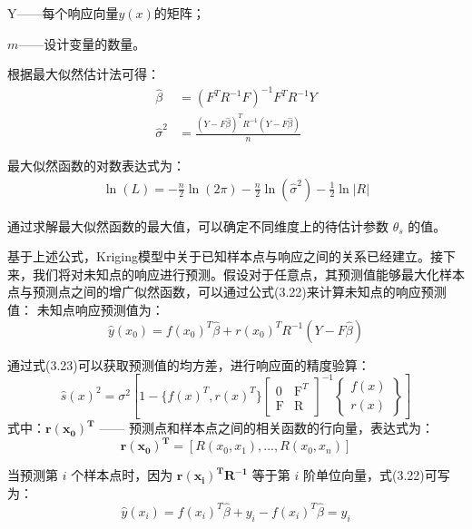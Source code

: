 \quad Y——每个响应向量$y(x)$的矩阵；
 
\quad$m$——设计变量的数量。

根据最大似然估计法可得：
\begin{align}
    \hat{\beta} &= (F^T R^{-1} F)^{-1} F^T R^{-1} Y
    \label{eq:2.8} \\
    \hat{\sigma}^2 &= \frac{(Y-F\hat{\beta})^T R^{-1} (Y-F\hat{\beta})}{n}
    \label{eq:2.9} 
\end{align}

最大似然函数的对数表达式为：
\begin{align}
\ln(L) = -\frac{n}{2} \ln(2\pi) - \frac{n}{2} \ln(\hat{\sigma}^2) - \frac{1}{2} \ln |R|
\end{align}

通过求解最大似然函数的最大值，可以确定不同维度上的待估计参数 $\theta_s$ 的值。

基于上述公式，Kriging模型中关于已知样本点与响应之间的关系已经建立。接下来，我们将对未知点的响应进行预测。假设对于任意点，其预测值能够最大化样本点与预测点之间的增广似然函数，可以通过公式(3.22)来计算未知点的响应预测值：
未知点响应预测值为：
\begin{equation}
    \hat{y}(x_0) = f(x_0)^T \hat{\beta} + r(x_0)^T R^{-1} (Y-F\hat{\beta})
    \label{eq:3.22}
\end{equation}

通过式(3.23)可以获取预测值的均方差，进行响应面的精度验算：
\begin{equation}
   \hat{s}(x)^2=\sigma^2\left[1-\{f(x)^T,r(x)^T\}\left[ \begin{array} {cc}0 & \mathrm{F}^T \\ \mathrm{F} & \mathrm{R} \end{array}\right]^{-1}\left\{ \begin{array} {c}f(x) \\ r(x) \end{array}\right\}\right]
    \label{eq:3.23}
\end{equation}
式中：$\mathbf{r(x_0)^T}$ —— 预测点和样本点之间的相关函数的行向量，表达式为：
\begin{equation}
\mathbf{r(x_0)^T} = [R(x_0, x_1), ..., R(x_0, x_n)]
\end{equation}

当预测第 $i$ 个样本点时，因为 $\mathbf{r(x_i)^T R^{-1}}$ 等于第 $i$ 阶单位向量，式(3.22)可写为：
\begin{equation}
    \hat{y}(x_i) = f(x_i)^T \hat{\beta} + y_i - f(x_i)^T \hat{\beta} = y_i
    \label{eq:2.14}
\end{equation}

